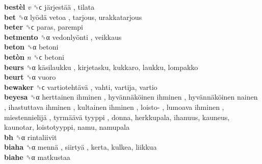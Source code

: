 \textbf{bestèl} \emph{v}  ␝ϲ   järjestää , tilata  \\
\textbf{bet} ␝α   lyödä vetoa , tarjous, urakkatarjous  \\
\textbf{beter} ␝ϲ  paras, parempi  \\
\textbf{betmento} ␝α   vedonlyönti , veikkaus  \\
\textbf{beton} ␝α  betoni  \\
\textbf{betòn} \emph{n}  ␝ϲ  betoni  \\
\textbf{beurs} ␝α   käsilaukku , kirjetasku, kukkaro, laukku, lompakko  \\
\textbf{beurt} ␝α  vuoro  \\
\textbf{bewaker} ␝ϲ   vartiotehtävä , vahti, vartija, vartio  \\
\textbf{beyesa} ␝α   herttainen ihminen ,  hyvännäköinen ihminen ,  hyvännäköinen nainen ,  ihastuttava ihminen ,  kultainen ihminen ,  loisto- ,  lumoava ihminen ,  miestennielijä ,  tyrmäävä tyyppi , donna, herkkupala, ihanuus, kauneus, kaunotar, loistotyyppi, namu, namupala  \\
\textbf{bh} ␝α  rintaliivit  \\
\textbf{biaha} ␝α   mennä ,  siirtyä , kerta, kulkea, liikkua  \\
\textbf{biahe} ␝α  matkustaa  \\
